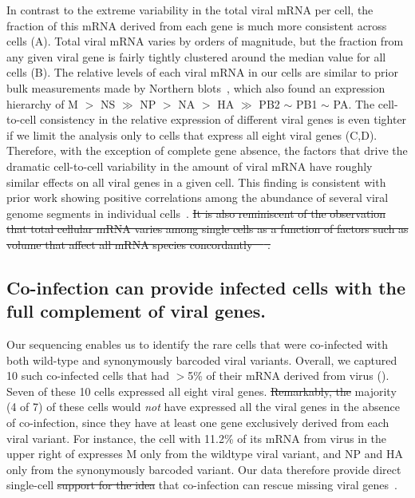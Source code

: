 \documentclass[9pt,lineno]{elife}
\providecommand{\DIFadd}[1]{{\protect\color{blue}\uwave{#1}}} %
\providecommand{\DIFdel}[1]{{\protect\color{red}\sout{#1}}}                      %
\providecommand{\DIFaddbegin}{} %
\providecommand{\DIFaddend}{} %
\providecommand{\DIFdelbegin}{} %
\providecommand{\DIFdelend}{} %
\begin{document}
In contrast to the extreme variability in the total viral mRNA per cell, the fraction of this \DIFaddbegin \DIFadd{viral }\DIFaddend mRNA derived from each gene is much more consistent across cells (A).
Total viral mRNA varies by orders of magnitude, but the fraction from any given viral gene is fairly tightly clustered around the median value for all cells (B).
The relative levels of each viral mRNA in our cells are similar to prior bulk measurements made by Northern blots~\citep{hatada1989control}, which also found an expression hierarchy of M $>$ NS $\gg$ NP $>$ NA $>$ HA $\gg$ PB2 $\sim$ PB1 $\sim$ PA.
The cell-to-cell consistency in the relative expression of different viral genes is even tighter if we limit the analysis only to cells that express all eight viral genes (C,D).
Therefore, with the exception of complete gene absence, the factors that drive the dramatic cell-to-cell variability in the amount of viral mRNA have roughly similar effects on all viral genes in a given cell.
This finding is consistent with prior work showing positive correlations among the abundance of several viral genome segments in individual cells~\citep{Heldt:2015iz}.
\DIFdelbegin \DIFdel{It is also reminiscent of the observation that total cellular mRNA varies among single cells as a function of factors such as volume that affect all mRNA species concordantly~\mbox{%
\citep{padovan2015single}}%
.
}\DIFdelend 

\subsection{Co-infection can provide infected cells with the full complement of viral genes.}
Our sequencing enables us to identify the rare cells that were co-infected with both wild-type and synonymously barcoded viral variants.
Overall, we captured 10 such co-infected cells that had $>$5\% of their mRNA derived from virus ().
Seven of these 10 cells expressed all eight viral genes.
\DIFdelbegin \DIFdel{Remarkably, the }\DIFdelend \DIFaddbegin \DIFadd{The }\DIFaddend majority (4 of 7) of these cells would \emph{not} have expressed all the viral genes in the absence of co-infection, since they have at least one gene exclusively derived from each viral variant.
For instance, the cell with 11.2\% of its mRNA from virus in the upper right of  expresses M only from the wildtype viral variant, and NP and HA only from the synonymously barcoded variant.
Our data therefore provide \DIFaddbegin \DIFadd{the first }\DIFaddend direct single-cell \DIFdelbegin \DIFdel{support for the idea }\DIFdelend \DIFaddbegin \DIFadd{observation of the fact }\DIFaddend that co-infection can rescue missing viral genes~\citep{Brooke:2013kb,brooke2014influenza,Fonville:2015cg,aguilera2017plaques}.
\end{document}
